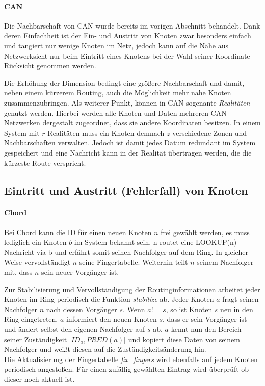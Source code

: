 
\paragraph{CAN}
Die Nachbarschaft von CAN wurde bereits im vorigen Abschnitt behandelt. Dank deren Einfachheit ist der Ein- und Austritt von Knoten zwar besonders einfach und tangiert nur wenige Knoten im Netz, jedoch kann auf die Nähe aus Netzwerksicht nur beim Eintritt eines Knotens bei der Wahl seiner Koordinate Rücksicht genommen werden.

Die Erhöhung der Dimension bedingt eine größere Nachbarschaft und damit, neben einem kürzerem Routing, auch die Möglichkeit mehr nahe Knoten zusammenzubringen. Als weiterer Punkt, können in CAN sogenante \emph{Realitäten} genutzt werden. Hierbei werden alle Knoten und Daten mehreren CAN-Netzwerken dergestalt zugeordnet, dass sie andere Koordinaten besitzen. In einem System mit $r$ Realitäten muss ein Knoten demnach $z$ verschiedene Zonen und Nachbarschaften verwalten. Jedoch ist damit jedes Datum redundant im System gespeichert und eine Nachricht kann in der Realität übertragen werden, die die kürzeste Route verspricht.


\subsection{Eintritt und Austritt (Fehlerfall) von Knoten}
\paragraph{Chord}
Bei Chord kann die ID für einen neuen Knoten $n$ frei gewählt werden, es muss lediglich ein Knoten $b$ im System bekannt sein. n routet eine LOOKUP(n)-Nachricht via b und erfährt somit seinen Nachfolger auf dem Ring. In gleicher Weise vervollständigt $n$ seine Fingertabelle. Weiterhin teilt $n$ seinem Nachfolger mit, dass $n$ sein neuer Vorgänger ist.

Zur Stabilisierung und Vervollständigung der Routinginformationen arbeitet jeder Knoten im Ring periodisch die Funktion \emph{stabilize} ab. Jeder Knoten $a$ fragt seinen Nachfolger $n$ nach dessen Vorgänger $s$. Wenn $a != s$, so ist Knoten $s$ neu in den Ring eingetreten. $a$ informiert den neuen Knoten $s$, dass er sein Vorgänger ist und ändert selbst den eigenen Nachfolger auf $s$ ab. $a$ kennt nun den Bereich seiner Zuständigkeit $[ID_a, PRED(a)[$ und kopiert diese Daten von seinem Nachfolger und weißt diesen auf die Zuständigkeitsänderung hin.\\
Die Aktualisierung der Fingertabelle \emph{fix\_fingers} wird ebenfalls auf jedem Knoten periodisch angestoßen. Für einen zufällig gewählten Eintrag wird überprüft ob dieser noch aktuell ist.

